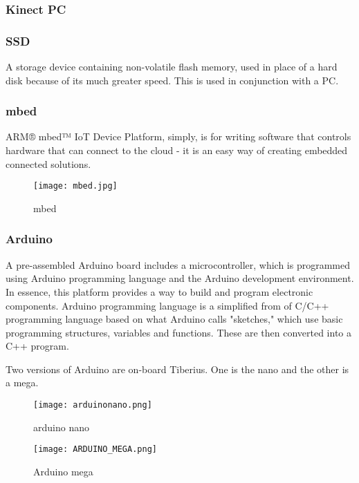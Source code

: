 \subsubsection{Kinect PC}

\subsubsection{SSD}
A storage device containing non-volatile flash memory, used in place of a hard disk because of its much greater speed. This is used in conjunction with a PC.

\subsubsection{mbed}
ARM® mbed™ IoT Device Platform, simply, is for writing software that controls hardware that can connect to the cloud - it is an easy way of creating embedded connected solutions.
\begin{figure}[!htb]
\begin{center}
\texttt{[image: mbed.jpg]}
\end{center}
\caption{mbed}
\label{fig:mbed}
\end{figure}

\subsubsection{Arduino}
A pre-assembled Arduino board includes a microcontroller, which is programmed using Arduino programming language and the Arduino development environment. In essence, this platform provides a way to build and program electronic components. Arduino programming language is a simplified from of C/C++ programming language based on what Arduino calls "sketches," which use basic programming structures, variables and functions. These are then converted into a C++ program. 

Two versions of Arduino are on-board Tiberius. One is the nano and the other is a mega.

\begin{figure}[!htb]
\begin{center}
\texttt{[image: arduinonano.png]}
\end{center}
\caption{arduino nano}
\label{fig:arduinoNano}
\end{figure}

\begin{figure}[!htb]
\begin{center}
\texttt{[image: ARDUINO\_MEGA.png]}
\end{center}
\caption{Arduino mega}
\label{fig:ArduinoMega}
\end{figure}

